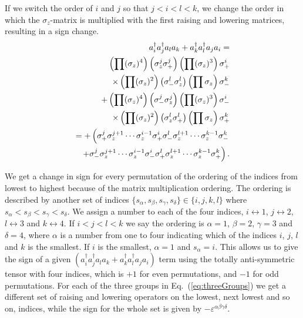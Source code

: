 If we switch the order of $i$ and $j$ so that $j<i<l<k$, we change the
order in which the $\sigma_z$-matrix is multiplied with the first
raising and lowering matrices, resulting in a sign change.
\begin{eqnarray}
a^\dag_i a^\dag_j a_l a_k  + a_k^\dag a_l^\dag a_j a_i
=\notag\\
\left(\prod (\sigma_z)^4\right) \left(\sigma_z^j \sigma_+^j\right)
\left(\prod (\sigma_z)^3\right) \sigma_+^i \notag \\
\times 
\left(\prod (\sigma_z)^2\right) \left(\sigma_-^l \sigma_z^l \right)
\left(\prod \sigma_z\right) \sigma_-^k \notag \\
 +\left(\prod (\sigma_z)^4\right) \left(\sigma_-^j\sigma_z^j\right)
\left(\prod (\sigma_z)^3\right) \sigma_-^i \notag \\
\times 
\left(\prod (\sigma_z)^2\right) \left(\sigma_z^l\sigma_+^l \right)
\left(\prod \sigma_z\right) \sigma_+^k \notag \\
=+\left(\sigma_+^j \sigma_z^{j+1}\cdots \sigma_z^{i-1} \sigma_+^i
\sigma_-^l \sigma_z^{l+1}\cdots \sigma_z^{k-1}\sigma_-^k\right.
\notag\\
 \left.+ \sigma_-^j \sigma_z^{j+1}\cdots \sigma_z^{i-1} \sigma_-^i
\sigma_+^l \sigma_z^{l+1}\cdots \sigma_z^{k-1}\sigma_+^k\right).
\end{eqnarray}






We get a change in sign for every permutation of the ordering
of the indices from lowest to highest because of the matrix
multiplication ordering. The ordering is described by another set of
indices \newline $\{s_\alpha, s_\beta, s_\gamma, s_\delta\} \in \{i, j, k, l\}$
where  
$s_\alpha< s_\beta< s_\gamma< s_\delta$. We assign a number to each of
the four indices, $i\leftrightarrow 1$, $j\leftrightarrow 2$,
$l\leftrightarrow 3$ and $k\leftrightarrow 4$. If $i<j<l<k$ we say the
ordering is $\alpha =1$, $\beta =2$, $\gamma=3$ and $\delta=4$, where
$\alpha$ is a number from one to four indicating which of the indices $i$, $j$,
$l$ and $k$ is the smallest. If $i$ is the smallest, $\alpha=1$ and
$s_\alpha= i$. This allows us to give the sign of a
given $(a^\dag_i a^\dag_j a_l a_k + a_k^\dag a_l^\dag a_j a_i)$ 
term using the totally anti-symmetric tensor with
four indices, which is $+1$ for even permutations, and $-1$ for odd
permutations. For each of the three groups in Eq.~(\ref{eq:threeGroups})
we get a different set of raising and lowering operators on the
lowest, next lowest and so on, indices, while the sign for the whole
set is given by $-\varepsilon^{\alpha\beta\gamma\delta}$.


